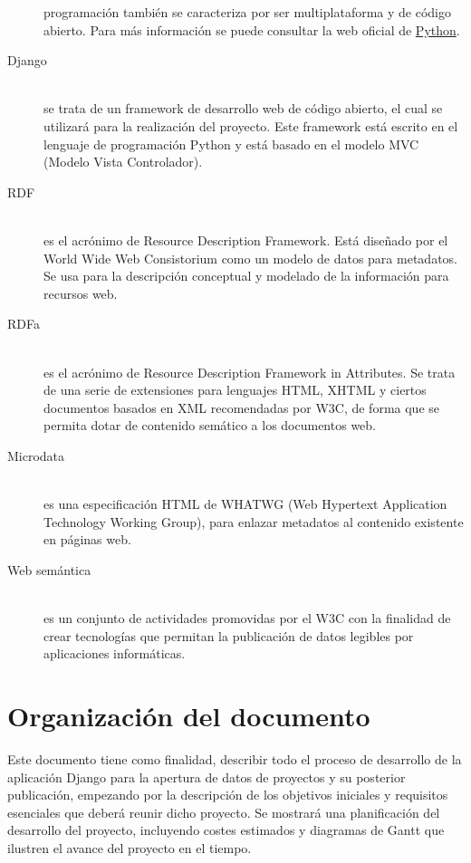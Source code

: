 \begin{description}
        programación también se caracteriza por ser multiplataforma y de código
        abierto. Para más información se puede consultar la web oficial de
        \href{http://es.wikipedia.org/wiki/Python}{Python}.
    \item[Django] \hfill \\
        se trata de un framework de desarrollo web de código abierto, el cual se
        utilizará para la realización del proyecto. Este framework está escrito
        en el lenguaje de programación Python y está basado en el modelo MVC
        (Modelo Vista Controlador).
    \item[RDF] \hfill \\
        \cite{rdfdoc} es el acrónimo de Resource Description Framework. Está diseñado por el
        World Wide Web Consistorium como un modelo de datos para metadatos. Se
        usa para la descripción conceptual y modelado de la información para
        recursos web.
    \item[RDFa] \hfill \\
        es el acrónimo de Resource Description Framework in Attributes. Se trata
        de una serie de extensiones para lenguajes HTML, XHTML y ciertos
        documentos basados en XML recomendadas por W3C, de forma que se permita
        dotar de contenido semático a los documentos web.
    \item[Microdata] \hfill \\
        es una especificación HTML de WHATWG (Web Hypertext Application
        Technology Working Group), para enlazar metadatos al contenido existente
        en páginas web.
    \item[Web semántica] \hfill \\
        es un conjunto de actividades promovidas por el W3C con la finalidad de
        crear tecnologías que permitan la publicación de datos legibles por
        aplicaciones informáticas.
\end{description}

\section{Organización del documento}

Este documento tiene como finalidad, describir todo el proceso de desarrollo de
la aplicación Django para la apertura de datos de proyectos y su posterior
publicación, empezando por la descripción de los objetivos iniciales y
requisitos esenciales que deberá reunir dicho proyecto. Se mostrará una
planificación del desarrollo del proyecto, incluyendo costes estimados y
diagramas de Gantt que ilustren el avance del proyecto en el tiempo.

